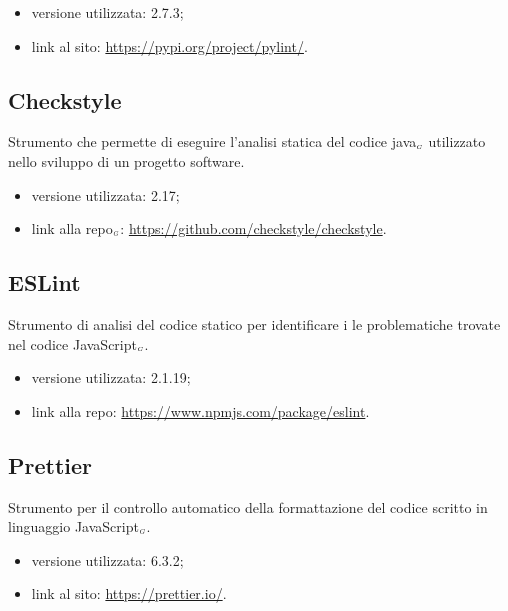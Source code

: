 \begin{itemize}
  \item versione utilizzata: 2.7.3;
  \item link al sito: \url{https://pypi.org/project/pylint/}.
\end{itemize}

\subsection{Checkstyle}\label{LibrerieCheckstyle}
Strumento che permette di eseguire l’analisi statica del codice java$_{\scaleto{G}{3pt}}$ utilizzato nello sviluppo di un progetto software.

\begin{itemize}
  \item versione utilizzata: 2.17;
  \item link alla repo$_{\scaleto{G}{3pt}}$: \url{https://github.com/checkstyle/checkstyle}.
\end{itemize}

\subsection{ESLint}\label{LibrerieESLint}
Strumento di analisi del codice statico per identificare i le problematiche trovate nel codice JavaScript$_{\scaleto{G}{3pt}}$.

\begin{itemize}
  \item versione utilizzata: 2.1.19;
  \item link alla repo: \url{https://www.npmjs.com/package/eslint}.
\end{itemize}

\subsection{Prettier}\label{LibreriePrettier}
Strumento per il controllo automatico della formattazione del codice scritto in linguaggio JavaScript$_{\scaleto{G}{3pt}}$.

\begin{itemize}
  \item versione utilizzata: 6.3.2;
  \item link al sito: \url{https://prettier.io/}.
\end{itemize}
